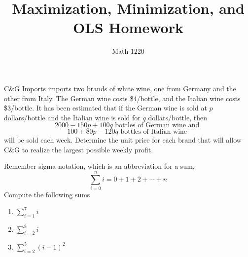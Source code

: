 \documentclass[12pt, a4paper]{article}
\author{Math 1220}
\title{Maximization, Minimization, and OLS Homework}
\date{}
\begin{document}
\maketitle
\nameline
\begin{ex}
  C\&G Imports imports two brands of white wine, one from Germany and
  the other from Italy. The German wine costs \$4/bottle, and the
  Italian wine costs \$3/bottle. It has been estimated that if the
  German wine is sold at \(p\) dollars/bottle and the Italian wine is
  sold for \(q\) dollars/bottle, then \[
    2000-150p+100q \text{ bottles of German wine and } 
  \]
  \[
    100+80p-120q \text{ bottles of Italian wine }
  \]
  will be sold each week. Determine the unit price for each brand that
  will allow C\&G to realize the largest possible weekly profit.
\end{ex}
\begin{ex}
  Remember sigma notation, which is an abbreviation for a sum, \[
    \sum_{i=0}^n i = 0+1+2+ \cdots + n
  \]
  Compute the following sums
  \begin{enumerate}
  \item \(\sum_{i=1}^7 i\)
  \item \(\sum_{i=2}^8 i\)
  \item \(\sum_{i=2}^5 (i-1)^2\)
  \end{enumerate}
\end{ex}
\vspace{-2in}
\end{document}
